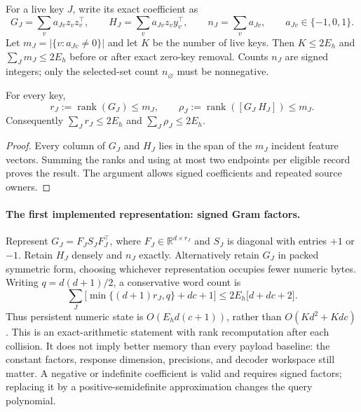For a live key $J$, write its exact coefficient as
\[
 G_J=\sum_v a_{Jv}z_vz_v^\top,\qquad
 H_J=\sum_v a_{Jv}z_vy_v^\top,\qquad
 n_J=\sum_v a_{Jv},\qquad a_{Jv}\in\{-1,0,1\}.
\]
Let $m_J=|\{v:a_{Jv}\ne0\}|$ and let $K$ be the number of live keys.
Then $K\le2E_h$ and $\sum_Jm_J\le2E_h$ before or after exact zero-key
removal. Counts $n_J$ are signed integers; only the selected-set count
$n_\varnothing$ must be nonnegative.

\begin{lemma}
For every key,
\[
 r_J:=\operatorname{rank}(G_J)\le m_J,
 \qquad
 \rho_J:=\operatorname{rank}([G_J\ H_J])\le m_J.
\]
Consequently $\sum_Jr_J\le2E_h$ and $\sum_J\rho_J\le2E_h$.
\end{lemma}
\begin{proof}
Every column of $G_J$ and $H_J$ lies in the span of the $m_J$ incident
feature vectors. Summing the ranks and using at most two endpoints per
eligible record proves the result. The argument allows signed coefficients
and repeated source owners.
\end{proof}

\paragraph{The first implemented representation: signed Gram factors.}
Represent $G_J=F_JS_JF_J^\top$, where $F_J\in\mathbb R^{d\times r_J}$ and
$S_J$ is diagonal with entries $+1$ or $-1$. Retain $H_J$ densely and
$n_J$ exactly. Alternatively retain $G_J$ in packed symmetric form, choosing
whichever representation occupies fewer numeric bytes. Writing
$q=d(d+1)/2$, a conservative word count is
\[
 \sum_J\bigl[\min\{(d+1)r_J,q\}+dc+1\bigr]
 \le 2E_h\bigl[d+dc+2\bigr].
\]
Thus persistent numeric state is $O(E_hd(c+1))$, rather than $O(Kd^2+Kdc)$.
This is an exact-arithmetic statement with rank recomputation after each
collision. It does not imply better memory than every payload baseline:
the constant factors, response dimension, precisions, and decoder workspace
still matter. A negative or indefinite coefficient is valid and requires
signed factors; replacing it by a positive-semidefinite approximation changes
the query polynomial.

